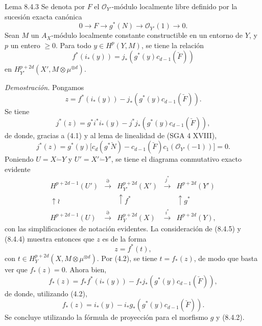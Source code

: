 \begin{statement}{Lema 8.4.3}
Se denota por $F$ el $\mathcal O_{Y'}$-módulo localmente libre definido por la sucesión exacta canónica
\[
0\to F\to g^*(N)\to\mathcal O_{Y'}(1)\to0.
\]
Sean $M$ un $A_X$-módulo localmente constante constructible en un entorno de $Y$, y $p$ un entero $\ge0$. Para todo $y\in H^p(Y,M)$, se tiene la relación
\[
f^*(i_*(y))=j_*(g^*(y)c_{d-1}(\check F))
\]
en $H_{Y'}^{p+2d}(X',M\otimes\mu^{\otimes d})$.
\end{statement}

\emph{Demostración.} Pongamos
\[
z=f^*(i_*(y))-j_*(g^*(y)c_{d-1}(\check F)).
\]
Se tiene
\[
j^*(z)=g^*i^*i_*(y)-j^*j_*(g^*(y)c_{d-1}(\check F)),
\]
de donde, gracias a (4.1) y al lema de linealidad de (SGA 4 XVIII),
\[
j^*(z)=g^*(y)\bigl[c_d(g^*\check N)-c_{d-1}(\check F)c_1(\mathcal O_{Y'}(-1))\bigr]=0.
\tag{8.4.4}
\]
Poniendo $U=X\mathbin{\dot{-}}Y$ y $U'=X'\mathbin{\dot{-}}Y'$, se tiene el diagrama conmutativo exacto evidente
\[
\begin{array}{ccccc}
H^{p+2d-1}(U')&\xrightarrow{\partial}&H^{p+2d}_{Y'}(X')&\xrightarrow{j^*}&H^{p+2d}(Y')\\
\uparrow\wr&&\uparrow f^*&&\uparrow g^*\\
H^{p+2d-1}(U)&\xrightarrow{\partial}&H_Y^{p+2d}(X)&\xrightarrow{i^*}&H^{p+2d}(Y),
\end{array}
\tag{8.4.5}
\]
con las simplificaciones de notación evidentes. La consideración de (8.4.5) y (8.4.4) muestra entonces que $z$ es de la forma
\[
z=f^*(t),
\]
con $t\in H_Y^{p+2d}(X,M\otimes\mu^{\otimes d})$. Por (4.2), se tiene $t=f_*(z)$, de modo que basta ver que $f_*(z)=0$. Ahora bien,
\[
f_*(z)=f_*f^*(i_*(y))-f_*j_*(g^*(y)c_{d-1}(\check F)),
\]
de donde, utilizando (4.2),
\[
f_*(z)=i_*(y)-i_*g_*(g^*(y)c_{d-1}(\check F)).
\]
Se concluye utilizando la fórmula de proyección para el morfismo $g$ y (8.4.2).
